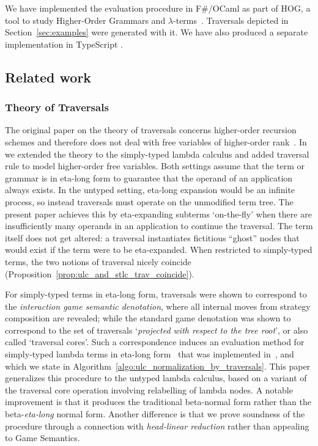 \documentclass{elsarticle}
\theoremstyle{plain}
\theoremstyle{definition}
\begin{document}
 We have implemented the evaluation procedure in F\#/OCaml as part of HOG, a tool to study Higher-Order Grammars and $\lambda$-terms~\cite{BlumGalop2008,Blum-HogTool}. Traversals depicted in Section~\ref{sec:examples} were generated with it.
 We have also produced a separate implementation in TypeScript
 \cite{BlumTypeScriptTraversal2019}.

\subsection{Related work}

\subsubsection{Theory of Traversals}

The original paper on the theory of traversals concerns higher-order recursion schemes and therefore does not deal with free variables of higher-order rank~\cite{OngLics2006}. In~\cite{BlumPhd} we extended the theory to the simply-typed lambda calculus and added traversal rule to model higher-order free variables. Both settings assume that the term or grammar is in eta-long form to guarantee that the operand of an application always exists.
In the untyped setting, eta-long expansion would be an infinite process, so instead traversals must operate on the unmodified term tree.
The present paper achieves this by eta-expanding subterms `on-the-fly' when there are insufficiently many operands in an application to continue the traversal. The term itself does not get altered: a traversal instantiates fictitious ``ghost'' nodes that would exist if the term were to be eta-expanded.
When restricted to simply-typed terms, the two notions of traversal nicely coincide (Proposition~\ref{prop:ulc_and_stlc_trav_coincide}).

For simply-typed terms in eta-long form, traversals were shown to correspond to the \emph{interaction game semantic denotation}, where all internal moves from strategy composition are revealed; while the standard game denotation was shown to correspond to the set of traversals `\emph{projected with respect to the tree root}', or also called `traversal cores'. Such a correspondence induces an evaluation method for simply-typed lambda terms in eta-long form~\cite{BlumPhd,BlumGalop2008,Ong-NormByTrav2015} that was implemented in~\cite{Blum-HogTool}, and which we state in Algorithm~\ref{algo:ulc_normalization_by_traversals}. This paper generalizes this procedure to the untyped lambda calculus, based on a variant of the traversal core operation involving relabelling of lambda nodes. A notable improvement is that it produces the traditional beta-normal form rather than the beta-\emph{eta-long} normal form. Another difference is that we prove soundness of the procedure through a connection with \emph{head-linear reduction} rather than appealing to Game Semantics.
\end{document}
